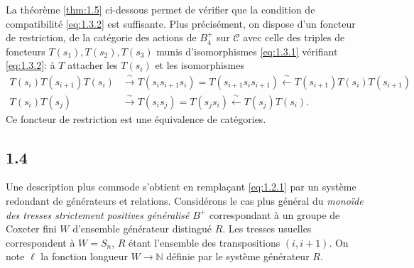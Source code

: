 \documentclass[11pt,a4paper]{article}
\theoremstyle{plain}
\theoremstyle{definition}
\newcommand{\cC}{\mathscr{C}}
\newcommand{\bbN}{\mathbb{N}}
\begin{document}
La th\'eor\`eme \ref{thm:1.5} ci-dessous permet de v\'erifier que la condition de compatibilit\'e \eqref{eq:1.3.2} est suffisante. Plus pr\'ecis\'ement, on dispose d'un foncteur de restriction, de la cat\'egorie des actions de $B_4^+$ sur $\cC$ avec celle des triples de foncteurs $T(s_1), T(s_2), T(s_3)$ munis d'isomorphismes \eqref{eq:1.3.1} v\'erifiant \eqref{eq:1.3.2}: \`a $T$ attacher les $T(s_i)$ et les isomorphismes
\[
\begin{aligned}
T(s_i) T(s_{i+1}) T(s_i) &\xrightarrow{\;\sim\;} T(s_i s_{i+1} s_i) = T(s_{i+1} s_i s_{i+1}) \xleftarrow{\;\sim\;} T(s_{i+1}) T(s_i) T(s_{i+1}) \\
T(s_i) T(s_j) &\xrightarrow{\;\sim\;} T(s_i s_j) = T(s_j s_i) \xleftarrow{\;\sim\;} T(s_j) T(s_i).
\end{aligned}
\]
Ce foncteur de restriction est une \'equivalence de cat\'egories.

\subsection*{1.4}\label{sec:1.4}

Une description plus commode s'obtient en rempla\c{c}ant \eqref{eq:1.2.1} par un syst\`eme redondant de g\'en\'erateurs et relations. Consid\'erons le cas plus g\'en\'eral du \emph{mono\"ide des tresses strictement positives g\'en\'eralis\'e} $B^+$ correspondant \`a un groupe de Coxeter fini $W$ d'ensemble g\'en\'erateur distingu\'e $R$. Les tresses usuelles correspondent \`a $W = S_n$, $R$ \'etant l'ensemble des transpositions $(i, i+1)$. On note $\ell$ la fonction longueur $W \to \bbN$ d\'efinie par le syst\`eme g\'en\'erateur $R$.
\end{document}
